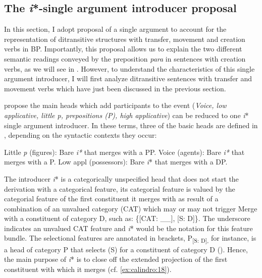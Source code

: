 \documentclass[output=paper,colorlinks,citecolor=brown,modfonts,nonflat]{langsci/langscibook}
\begin{document}
\subsection{The \textit{i}*-single argument introducer proposal}\label{sec:calindro:3.1}

In this section, I adopt  proposal of a single argument to account for the representation of ditransitive structures with transfer, movement and creation verbs in BP. Importantly, this proposal allows us to explain the two different semantic readings conveyed by the preposition \textit{para} in sentences with creation verbs, as we will see in . However, to understand the characteristics of this single argument introducer, I will first analyze ditransitive sentences with transfer and movement verbs which have just been discussed in the previous section.

\citet{WoodMarantz2017} propose the main heads which add participants to the event (\textit{Voice, low applicative, little p, prepositions (P), high applicative}) can be reduced to one \textit{i}* single argument introducer. In these terms, three of the basic heads are defined in , depending on the syntactic contexts they occur:

\ea%
    \label{ex:calindro:17}
    \ea\label{ex:calindro:17a} Little \textit{p} (figures): Bare \textit{i*} that merges with a PP.
    \ex\label{ex:calindro:17b} Voice (agents): Bare \textit{i*} that merges with a {\liv}P.
    \ex\label{ex:calindro:17c} Low appl (possessors): Bare \textit{i}* that merges with a DP. \citep[258]{WoodMarantz2017}
    \z
\z

The introducer \textit{i}* is a categorically unspecified head that does not start the derivation with a categorical feature, its categorial feature is valued by the categorial feature of the first constituent it merges with as result of a combination of an unvalued category (CAT) which may or may not trigger Merge with a constituent of category D, such as: \{[CAT: \_\_], [S: D]\}. The underscore indicates an unvalued CAT feature and \textit{i}* would be the notation for this feature bundle. The selectional features are annotated in brackets, P\textsubscript{[S: D],} for instance,\textsubscript{}  is a head of category P that selects (S) for a constituent of category D (\citealt[257]{WoodMarantz2017}). Hence, the main purpose of \textit{i}* is to close off the extended projection of the first constituent with which it merges (cf. \ref{ex:calindro:18}).
\end{document}
